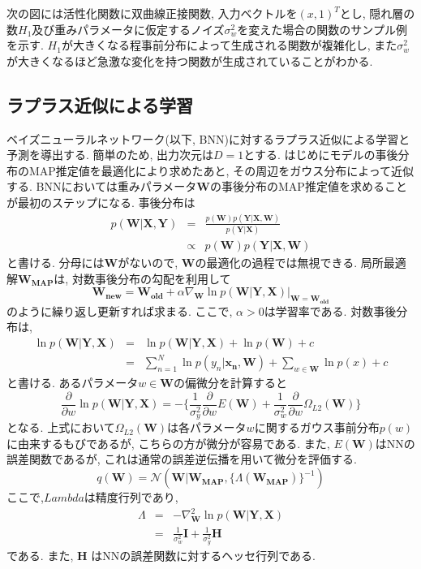 \documentclass[twocolumn]{jarticle}
\begin{document}
次の図には活性化関数に双曲線正接関数, 入力ベクトルを${(x, 1)^T}$とし, 隠れ層の数${H_1}$及び重みパラメータに仮定するノイズ${\sigma_w^2}$を変えた場合の関数のサンプル例を示す. ${H_1}$が大きくなる程事前分布によって生成される関数が複雑化し, また${\sigma_w^2}$が大きくなるほど急激な変化を持つ関数が生成されていることがわかる.

\subsection{ラプラス近似による学習}
ベイズニューラルネットワーク(以下, BNN)に対するラプラス近似による学習と予測を導出する. 簡単のため, 出力次元は${D = 1}$とする. はじめにモデルの事後分布のMAP推定値を最適化により求めたあと, その周辺をガウス分布によって近似する. BNNにおいては重みパラメータ${\bm {W}}$の事後分布のMAP推定値を求めることが最初のステップになる. 事後分布は
\begin{eqnarray}
  p(\bm {W|X, Y}) &=& \frac{p(\bm {W})p(\bm {Y|X, W})}{p(\bm {Y|X})} \nonumber \\
   &\propto& p(\bm {W})p(\bm {Y|X, W})
\end{eqnarray}
と書ける. 分母には${\bm {W}}$がないので, ${\bm {W}}$の最適化の過程では無視できる.
局所最適解${\bm {W_{MAP}}}$は, 対数事後分布の勾配を利用して
\begin{equation}
  \bm {W_{new}} = \bm {W_{old}} + \alpha \nabla_{\bm {W}} \ln p(\bm {W|Y, X})|_{\bm {W = W_{old}}}
\end{equation}
のように繰り返し更新すれば求まる. ここで, ${\alpha > 0}$は学習率である. 対数事後分布は,
\begin{eqnarray}
  \ln p(\bm {W|Y, X}) &=& \ln p(\bm {W|Y, X}) + \ln p(\bm {W}) + c \nonumber \\
  &=& \sum_{n=1}^{N} \ln p(y_n|\bm {x_n, W}) + \sum_{w \in \bm {W}} \ln p(x) + c
\end{eqnarray}
と書ける. あるパラメータ${w \in \bm {W}}$の偏微分を計算すると
\begin{equation}
  \frac{\partial }{\partial w}\ln p(\bm {W|Y, X}) = - \{\frac{1}{\sigma_y^2}\frac{\partial}{\partial w}E(\bm {W}) + \frac{1}{\sigma_w^2}\frac{\partial}{\partial w}\Omega_{L2}(\bm {W})\}
\end{equation}
となる. 上式において${\Omega_{L2}(\bm {W})}$は各パラメータ${w}$に関するガウス事前分布${p(w)}$に由来するもびであるが, こちらの方が微分が容易である. また, ${E(\bm {W})}$はNNの誤差関数であるが, これは通常の誤差逆伝播を用いて微分を評価する.
\begin{equation}
  q(\bm {W}) = \mathcal{N} (\bm {W|W_{MAP}}, \{\Lambda (\bm {W_{MAP}}) \}^{-1})
\end{equation}
ここで,${Lambda}$は精度行列であり,
\begin{eqnarray}
  \Lambda &=& - \nabla _{\bm {W}}^2 \ln p(\bm {W|Y, X}) \nonumber \\
  &=& \frac{1}{\sigma_w^2}\bm {I} + \frac{1}{\sigma_y^2}\bm {H}
\end{eqnarray}
である. また, ${\bm {H}}$ はNNの誤差関数に対するヘッセ行列である.
\end{document}
